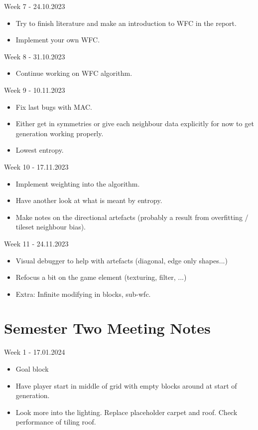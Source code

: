 \noindent Week 7 - 24.10.2023
\begin{itemize}
    \item Try to finish literature and make an introduction to WFC in the report.
    \item Implement your own WFC.
\end{itemize}

\noindent Week 8 - 31.10.2023
\begin{itemize}
    \item Continue working on WFC algorithm.
\end{itemize}

\noindent Week 9 - 10.11.2023
\begin{itemize}
    \item Fix last bugs with MAC.
    \item Either get in symmetries or give each neighbour data explicitly for now to get generation working properly.
    \item Lowest entropy.
\end{itemize}

\noindent Week 10 - 17.11.2023
\begin{itemize}
    \item Implement weighting into the algorithm.
    \item Have another look at what is meant by entropy.
    \item Make notes on the directional artefacts (probably a result from overfitting / tileset neighbour bias).
\end{itemize}

\noindent Week 11 - 24.11.2023
\begin{itemize}
    \item Visual debugger to help with artefacts (diagonal, edge only shapes...)
    \item Refocus a bit on the game element (texturing, filter, ...)
    \item Extra: Infinite modifying in blocks, sub-wfc.
\end{itemize}

\section{Semester Two Meeting Notes}
\label{sec:semester_two_meeting_notes}
\noindent Week 1 - 17.01.2024
\begin{itemize}
    \item Goal block
    \item Have player start in middle of grid with empty blocks around at start of generation.
    \item Look more into the lighting. Replace placeholder carpet and roof. Check performance of tiling roof.
\end{itemize}

